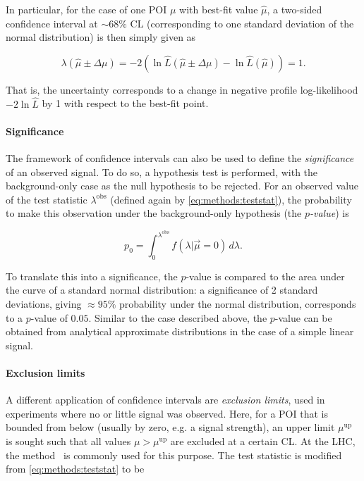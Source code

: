 In particular, for the case of one POI $\mu$ with best-fit value $\hat{\mu}$, a two-sided confidence interval at $\sim 68\%$ CL (corresponding to one standard deviation of the normal distribution) is then simply given as~\cite{Cowan:2010js}

\begin{equation}
    \lambda(\hat{\mu} \pm \Delta \mu) = -2 (\ln \hat{L} (\hat{\mu} \pm \Delta \mu) - \ln \hat{L} (\hat{\mu})) = 1.
\end{equation}

That is, the uncertainty corresponds to a change in negative profile log-likelihood $-2 \ln \hat{L}$ by 1 with respect to the best-fit point.

\paragraph{Significance}

The framework of confidence intervals can also be used to define the \textit{significance} of an observed signal. To do so, a hypothesis test is performed, with the background-only case as the null hypothesis to be rejected. For an observed value of the test statistic $\lambda^{\mathrm{obs}}$ (defined again by \cref{eq:methods:teststat}), the probability to make this observation under the background-only hypothesis (the \textit{$p$-value}) is

\begin{equation}
\label{eq:methods:pvalue}
    p_0 = \int_0^{\lambda^{\mathrm{obs}}} f(\lambda | \vec{\mu} = 0) \, d\lambda.
\end{equation}

To translate this into a significance, the $p$-value is compared to the area under the curve of a standard normal distribution: a significance of 2 standard deviations, giving $\approx 95\%$ probability under the normal distribution, corresponds to a $p$-value of $0.05$. Similar to the case described above, the $p$-value can be obtained from analytical approximate distributions in the case of a simple linear signal.

\paragraph{Exclusion limits}

A different application of confidence intervals are \textit{exclusion limits}, used in experiments where no or little signal was observed. Here, for a POI that is bounded from below (usually by zero, e.g. a signal strength), an upper limit $\mu^{\mathrm{up}}$ is sought such that all values $\mu > \mu^{\mathrm{up}}$ are excluded at a certain CL. At the LHC, the \CLs method~\cite{Junk:1999kv,Read:2002hq} is commonly used for this purpose. The test statistic is modified from \cref{eq:methods:teststat} to be 

